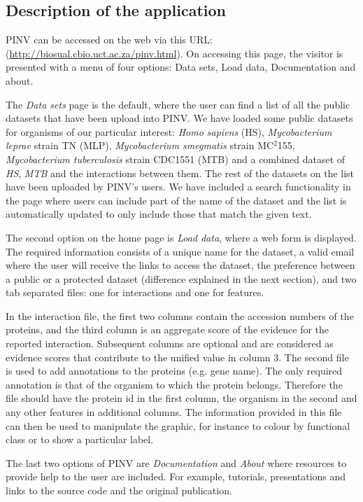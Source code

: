 \subsection{Description of the application} \label{section:pinv_gui}

PINV can be accessed on the web via this URL: (\url{http://biosual.cbio.uct.ac.za/pinv.html}). On accessing this page, the visitor is presented with a menu of four options: Data sets, Load data, Documentation and about. 

The \emph{Data sets} page is the default, where the user can find a list of all the public datasets that have been upload into PINV. We have loaded some public datasets for organisms of our particular interest: \emph{Homo sapiens} (HS), \emph{Mycobacterium leprae} strain TN (MLP), \emph{Mycobacterium smegmatis} strain MC$^2$155, \emph{Mycobacterium tuberculosis} strain CDC1551  (MTB) and a combined dataset of \emph{HS}, \emph{MTB} and the interactions between them. The rest of the datasets on the list have been uploaded by PINV's users. We have included a search functionality in the page where users can include part of the name of the dataset and the list is automatically updated to only include those that match the given text.

The second option on the home page is \emph{Load data}, where a web form is displayed. The required information consists of a unique name for the dataset, a valid email where the user will receive the links to access the dataset, the preference between a public or a protected dataset (difference explained in the next section), and two tab separated files: one for interactions and one for features.

In the interaction file, the first two columns contain the accession numbers of the proteins, and the third column is an aggregate score of the evidence for the reported interaction. Subsequent columns are optional and are considered as evidence scores that contribute to the unified value in column 3.
The second file is used to add annotations to the proteins (e.g. gene name). The only required annotation is that of the organism to which the protein belongs. Therefore the file should have the protein id in the first column, the organism in the second and any other features in additional columns. The information provided in this file can then be used to manipulate the graphic, for instance to colour by functional class or to show a particular label.

The last two options of PINV are \emph{Documentation} and \emph{About} where resources to provide help to the user are included. For example, tutorials, presentations and links to the source code and the original publication.

